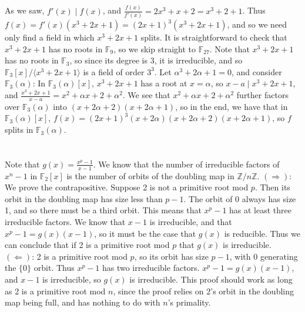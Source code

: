 \documentclass[11pt]{article}
\def\F{\mathbb{F}}
\def\a{\alpha}
\begin{document}
\subsection{} %
As we saw, $f'(x)\mid f(x)$, and $\frac{f(x)}{f'(x)}=2x^3+x+2=x^3+2+1$.
Thus $f(x)=f'(x)(x^3+2x+1)=(2x+1)^3(x^3+2x+1)$, and so we need only find a field in which $x^3+2x+1$ splits.
\newline
\newline
It is straightforward to check that $x^3+2x+1$ has no roots in $\F_9$, so we skip straight to $\F_{27}$.
\newline
\newline
Note that $x^3+2x+1$ has no roots in $\F_3$, so since its degree is 3, it is irreducible, and so $\F_3[x]/\langle x^3+2x+1\rangle$ is a field of order $3^3$.
Let $\a^3+2\a+1=0$, and consider $\F_3(\a)$:
\newline
\newline
In $\F_3(\a)[x]$, $x^3+2x+1$ has a root at $x=\a$, so $x-a\mid x^3+2x+1$, and $\frac{x^3+2x+1}{x-a}=x^2+\a x+2+\a^2$.
We see that $x^2+\a x+2+\a^2$ further factors over $\F_3(\a)$ into $(x+2\a+2)(x+2\a+1)$, so in the end, we have that in $\F_3(\a)[x]$, $f(x)=(2x+1)^3(x+2\a)(x+2\a+2)(x+2\a+1)$, so $f$ splits in $\F_3(\a)$.


\section{} %
Note that $g(x)=\frac{x^p-1}{x-1}$.
We know that the number of irreducible factors of $x^n-1$ in $\F_2[x]$ is the number of orbits of the doubling map in $\mathbb{Z}/n\mathbb{Z}$.
\newline
\newline
$(\Rightarrow)$: We prove the contrapositive.
Suppose 2 is not a primitive root mod $p$.
Then its orbit in the doubling map has size less than $p-1$.
The orbit of $0$ always has size 1, and so there must be a third orbit.
This means that $x^p-1$ has at least three irreducible factors.
We know that $x-1$ is irreducible, and that $x^p-1=g(x)(x-1)$, so it must be the case that $g(x)$ is reducible.
Thus we can conclude that if 2 is a primitive root mod $p$ that $g(x)$ is irreducible.
\newline
\newline
$(\Leftarrow)$: 2 is a primitive root mod $p$, so its orbit has size $p-1$, with $0$ generating the $\{0\}$ orbit.
Thus $x^p-1$ has two irreducible factors.
$x^p-1=g(x)(x-1)$, and $x-1$ is irreducible, so $g(x)$ is irreducible.
\newline
\newline
This proof should work as long as 2 is a primitive root mod $n$, since the proof relies on 2's orbit in the doubling map being full, and has nothing to do with $n$'s primality.
\end{document}
